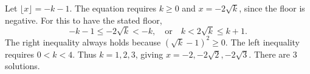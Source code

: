 Let $\lfloor x\rfloor=-k-1$. The equation requires $k\ge 0$ and $x=-2\sqrt k$, since the floor is negative. For this to have the stated floor,\[-k-1\le-2\sqrt k<-k,\quad\text{or}\quad k<2\sqrt k\le k+1.\]The right inequality always holds because $(\sqrt k-1)^2\ge 0$. The left inequality requires $0<k<4$. Thus $k=1,2,3$, giving $x=-2,-2\sqrt 2,-2\sqrt 3$. There are $\boxed 3$ solutions.
